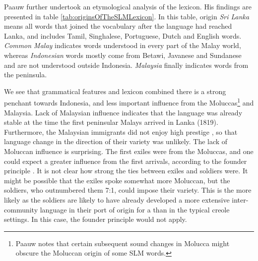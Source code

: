 Paauw further undertook an etymological analysis of the lexicon.
His findings are presented in table
\ref{tab:originsOfTheSLMLexicon}. In this table, origin \textit{Sri Lanka} means all words that joined the vocabulary after the language had reached Lanka, and includes Tamil, Singhalese, Portuguese, Dutch and English words. \textit{Common Malay} indicates words understood in every part of the Malay world, whereas \textit{Indonesian} words mostly come from Betawi, Javanese and Sundanese and are not understood outside Indonesia\kuckn. \textit{Malaysia} finally indicates words from the peninsula.

We see that grammatical features and lexicon combined there is a
strong penchant towards Indonesia, and less important influence
from the Moluccas\footnote{Paauw notes that certain subsequent
sound changes in Molucca might obscure the Moluccan origin of some
SLM words.} and Malaysia.  Lack of Malaysian influence indicates
that the language was already stable at the time the first
peninsular Malays arrived in Lanka (1819). Furthermore, the Malaysian immigrants did not enjoy high prestige \citep{abc}, so that language change in the direction of their variety was unlikely. The lack of
Moluccan influence is surprising. The first exiles were from the
Moluccas, and one could expect a greater influence from the first
arrivals, according to the founder principle \citep{abc}. It is not clear
how strong the ties between exiles and soldiers were. It might be
possible that the exiles spoke somewhat more Moluccan, but the
soldiers, who outnumbered them 7:1, could impose their variety.
This is the more likely as the soldiers are likely to have already
developed a more extensive inter-community language  in their port
of origin for a than in the typical creole settings. In this
case, the founder principle would not apply.
 

